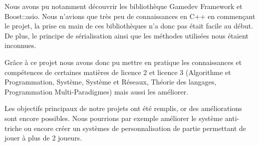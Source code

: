 \documentclass[a4paper, 12pt]{article}
\begin{document}
Nous avons pu notamment découvrir les bibliothèque Gamedev Framework et Boost::asio. Nous n’avions que très peu de connaissances en C++ en commençant le projet, la prise en main de ces bibliothèques n’a donc pas était facile au début. De plus, le principe de sérialisation ainsi que les méthodes utilisées nous étaient inconnues.

Grâce à ce projet nous avons donc pu mettre en pratique les connaissances et compétences de certaines matières de licence 2 et licence 3 (Algorithme et Programmation, Système, Système et Réseaux, Théorie des langages, Programmation Multi-Paradigmes) mais aussi les améliorer.

Les objectifs principaux de notre projets ont été remplis, or des améliorations sont encore possibles.
Nous pourrions par exemple améliorer le système anti-triche ou encore créer un systèmes de personnalisation de partie permettant de jouer à plus de 2 joueurs.
\end{document}

